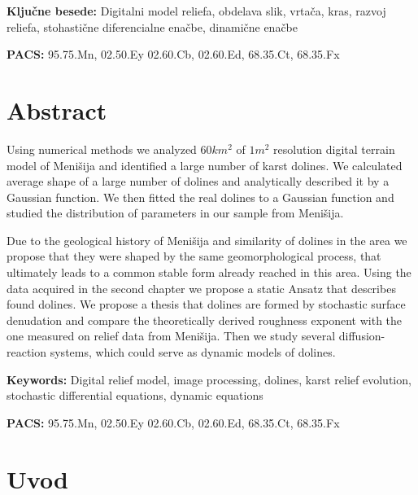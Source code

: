 \documentclass[a4paper, twoside, 12pt]{book}
\newcommand{\clearemptydoublepage}{\newpage{\pagestyle{empty}\cleardoublepage}}
\begin{document}
\vspace{1cm}

\noindent \textbf{Ključne besede:} Digitalni model reliefa, obdelava slik, vrtača, kras, razvoj reliefa, stohastične diferencialne enačbe, dinamične enačbe
\smallskip

\noindent \textbf{PACS:} 95.75.Mn, 02.50.Ey 02.60.Cb, 02.60.Ed, 68.35.Ct, 68.35.Fx
\clearemptydoublepage
{}

\chapter*{Abstract}

  Using numerical methods we analyzed $60 km^2$ of $1m^2$ resolution digital terrain model of Menišija and identified a large number of karst dolines. We calculated average shape of a large number of dolines and analytically described it by a Gaussian function. We then fitted the real dolines to a Gaussian function and studied the distribution of parameters in our sample from Menišija.

  Due to the geological history of Menišija and similarity of dolines in the area we propose that they were shaped by the same geomorphological process, that ultimately leads to a common stable form already reached in this area.
  Using the data acquired in the second chapter we propose a static Ansatz that describes found dolines. We propose a thesis that dolines are formed by stochastic surface denudation and compare the theoretically derived roughness exponent with the one measured on relief data from Menišija. Then we study several diffusion-reaction systems, which could serve as dynamic models of dolines.

\vspace{1cm}

\noindent \textbf{Keywords:} Digital relief model, image processing, dolines, karst relief evolution, stochastic differential equations, dynamic equations
\smallskip

\noindent \textbf{PACS:} 95.75.Mn, 02.50.Ey 02.60.Cb, 02.60.Ed, 68.35.Ct, 68.35.Fx
\clearemptydoublepage

\pagestyle{fancy}
\rhead{\thepage}

\tableofcontents{}
\clearemptydoublepage

\chapter{Uvod}
\label{ch:uvod}
\end{document}
